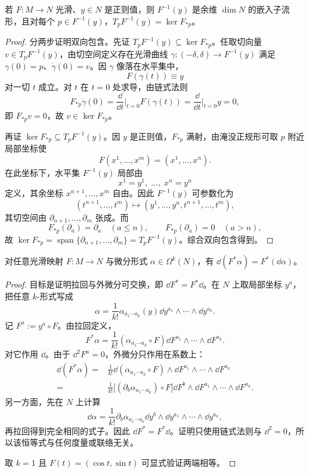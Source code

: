 \begin{proposition}[正则水平集的切空间]
若 $F:M\to N$ 光滑、$y\in N$ 是正则值，则 $F^{-1}(y)$ 是余维 $\dim N$ 的嵌入子流形，且对每个 $p\in F^{-1}(y)$，$T_pF^{-1}(y)=\ker F_{*p}$。
\end{proposition}
\begin{proof}
分两步证明双向包含。先证 $T_pF^{-1}(y)\subseteq\ker F_{*p}$。任取切向量 $v\in T_pF^{-1}(y)$，由切空间定义存在光滑曲线 $\gamma:(-\delta,\delta)\to F^{-1}(y)$ 满足 $\gamma(0)=p$、$\dot\gamma(0)=v$。因 $\gamma$ 像落在水平集中，
\[
F(\gamma(t))\equiv y
\]
对一切 $t$ 成立。对 $t$ 在 $t=0$ 处求导，由链式法则
\[
F_{*p}\dot\gamma(0)
=\frac{\dd}{\dd t}\bigg|_{t=0}F(\gamma(t))
=\frac{\dd}{\dd t}\bigg|_{t=0}y=0,
\]
即 $F_{*p}v=0$，故 $v\in\ker F_{*p}$。

再证 $\ker F_{*p}\subseteq T_pF^{-1}(y)$。因 $y$ 是正则值，$F_{*p}$ 满射，由淹没正规形可取 $p$ 附近局部坐标使
\[
F(x^1,\ldots,x^m)=(x^1,\ldots,x^n).
\]
在此坐标下，水平集 $F^{-1}(y)$ 局部由
\[
x^1=y^1,\;\ldots,\;x^n=y^n
\]
定义，其余坐标 $x^{n+1},\ldots,x^m$ 自由。因此 $F^{-1}(y)$ 可参数化为
\[
(t^{n+1},\ldots,t^m)\longmapsto
(y^1,\ldots,y^n,t^{n+1},\ldots,t^m),
\]
其切空间由 $\partial_{n+1},\ldots,\partial_m$ 张成。而
\[
F_{*p}(\partial_a)=\partial_a\quad(a\le n),
\qquad
F_{*p}(\partial_a)=0\quad(a>n),
\]
故 $\ker F_{*p}=\operatorname{span}\{\partial_{n+1},\ldots,\partial_m\}=T_pF^{-1}(y)$。综合双向包含得到。
\end{proof}

\begin{lemma}[拉回与外微分交换]
对任意光滑映射 $F:M\to N$ 与微分形式 $\alpha\in\Omega^k(N)$，有 $\dd(F^*\alpha)=F^*(\dd\alpha)$。
\end{lemma}
\begin{proof}
目标是证明拉回与外微分可交换，即 $\dd F^*=F^*\dd$。在 $N$ 上取局部坐标 $y^a$，把任意 $k$-形式写成
\[
\alpha
=\frac1{k!}\alpha_{a_1\cdots a_k}(y)
\dd y^{a_1}\wedge\cdots\wedge\dd y^{a_k}.
\]
记 $F^a:=y^a\circ F$。由拉回定义，
\[
F^*\alpha
=\frac1{k!}(\alpha_{a_1\cdots a_k}\circ F)
\dd F^{a_1}\wedge\cdots\wedge\dd F^{a_k}.
\]
对它作用 $\dd$。由于 $\dd^2F^a=0$，外微分只作用在系数上：
\[
\begin{aligned}
\dd(F^*\alpha)
={}&\frac1{k!}
\dd(\alpha_{a_1\cdots a_k}\circ F)
\wedge\dd F^{a_1}\wedge\cdots\wedge\dd F^{a_k}\\
={}&\frac1{k!}
\bigl[(\partial_b\alpha_{a_1\cdots a_k})\circ F\bigr]
\dd F^b\wedge\dd F^{a_1}\wedge\cdots\wedge\dd F^{a_k}.
\end{aligned}
\]
另一方面，先在 $N$ 上计算
\[
\dd\alpha
=\frac1{k!}\partial_b\alpha_{a_1\cdots a_k}
\dd y^b\wedge\dd y^{a_1}\wedge\cdots\wedge\dd y^{a_k},
\]
再拉回得到完全相同的式子。因此 $\dd F^*=F^*\dd$。证明只使用链式法则与 $\dd^2=0$，所以该恒等式与任何度量或联络无关。

取 $k=1$ 且 $F(t)=(\cos t,\sin t)$ 可显式验证两端相等。
\end{proof}

